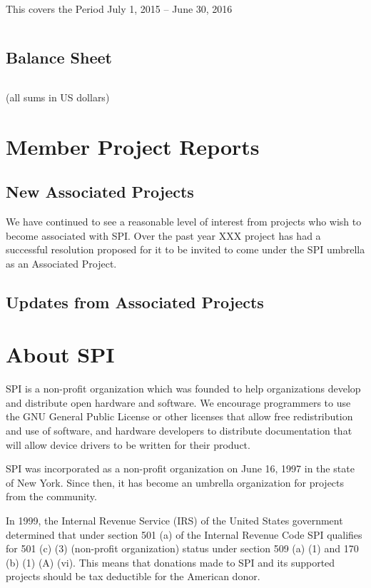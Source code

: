 \documentclass[letterpaper]{report}
\begin{document}
This covers the Period July 1, 2015 -- June 30, 2016

\begin{verbatim}
\end{verbatim}

\section{Balance Sheet}

\begin{verbatim}
\end{verbatim}

(all sums in US dollars)


\chapter{Member Project Reports}

\section{New Associated Projects}

We have continued to see a reasonable level of interest from projects who wish
to become associated with SPI.  Over the past year XXX project has had
a successful resolution proposed for it to be invited to come under the SPI
umbrella as an Associated Project.


\section{Updates from Associated Projects}


\appendix
\chapter{About SPI}

SPI is a non-profit organization which was founded to help organizations
develop and distribute open hardware and software. We encourage programmers
to use the GNU General Public License or other licenses that allow free
redistribution and use of software, and hardware developers to distribute
documentation that will allow device drivers to be written for their product.

SPI was incorporated as a non-profit organization on June 16, 1997 in the state
of New York. Since then, it has become an umbrella organization for projects
from the community.

In 1999, the Internal Revenue Service (IRS) of the United States government
determined that under section 501 (a) of the Internal Revenue Code SPI
qualifies for 501 (c) (3) (non-profit organization) status under section 509
(a) (1) and 170 (b) (1) (A) (vi). This means that donations made to SPI and its
supported projects should be tax deductible for the American donor.
\end{document}
